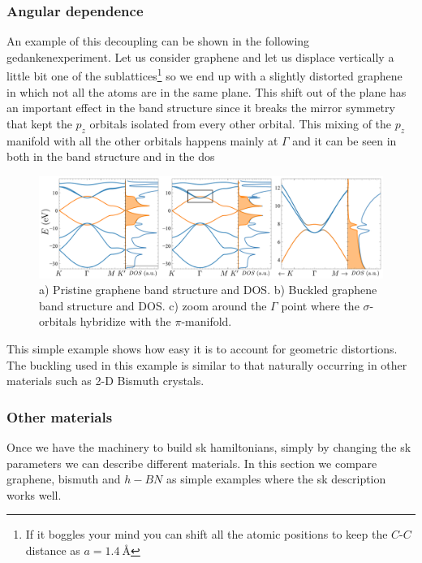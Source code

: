 \subsubsection{Angular dependence}
An example of this decoupling can be shown in the following gedankenexperiment. Let us consider graphene and let us displace vertically a little bit one of the sublattices\footnote{If it boggles your mind you can shift all the atomic positions to keep the $C$-$C$ distance as $a=\SI{1.4}{\angstrom}$}
so we end up with a slightly distorted graphene in which not all the atoms are in the same plane. This shift out of the plane has an important effect in the band structure since it breaks the mirror symmetry that kept the $p_z$ orbitals isolated from every other orbital.
This mixing of the $p_z$ manifold with all the other orbitals happens mainly at $\Gamma$ and it can be seen in both in the band structure and in the \ac{dos}
\begin{figure}[h!]
\centering
\includegraphics{graphene/figures/banddos_G_buck.pdf}
\vspace{-5pt}
\caption{a) Pristine graphene band structure and DOS. b) Buckled graphene band structure and DOS. c) zoom around the $\Gamma$ point where the $\sigma$-orbitals hybridize with the $\pi$-manifold.}
\label{fig:buckling}
\end{figure}
\FloatBarrier
This simple example shows how easy it is to account for geometric distortions. The buckling used in this example is similar to that naturally occurring in other materials such as 2-D Bismuth crystals.

\subsubsection{Other materials}
Once we have the machinery to build \ac{sk} hamiltonians, simply by changing the \ac{sk} parameters we can describe different materials.
In this section we compare graphene, bismuth and $h-BN$  %
as simple examples where the \ac{sk} description works well.\\

